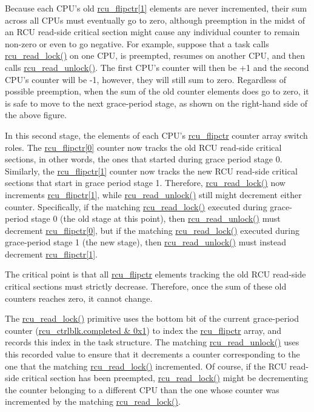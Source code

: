 Because each CPU's old \url{rcu_flipctr[1]} elements are never
incremented, their sum across all CPUs must eventually go to zero,
although preemption in the midst of an RCU read-side critical section might
cause any individual counter to remain non-zero or even to go negative.
For example, suppose that a task calls \url{rcu_read_lock()} on
one CPU, is preempted, resumes on another CPU, and then calls
\url{rcu_read_unlock()}.
The first CPU's counter will then be +1 and the second CPU's counter
will be -1, however, they will still sum to zero.
Regardless of possible preemption, when the sum of the old counter
elements does go to zero, it is safe to move to the next grace-period
stage, as shown on the right-hand side of the above figure.

In this second stage, the elements of each CPU's \url{rcu_flipctr}
counter array switch roles.
The \url{rcu_flipctr[0]} counter now tracks the old RCU read-side
critical sections, in other words, the ones that started during
grace period stage 0.
Similarly, the \url{rcu_flipctr[1]} counter now tracks the new
RCU read-side critical sections that start in grace period stage 1.
Therefore, \url{rcu_read_lock()} now increments
\url{rcu_flipctr[1]}, while \url{rcu_read_unlock()} still
might decrement either counter.
Specifically, if the matching \url{rcu_read_lock()} executed
during grace-period stage 0 (the old stage at this point), then
\url{rcu_read_unlock()} must decrement \url{rcu_flipctr[0]},
but if the matching \url{rcu_read_lock()} executed during
grace-period stage 1 (the new stage), then \url{rcu_read_unlock()}
must instead decrement \url{rcu_flipctr[1]}.

The critical point is that all \url{rcu_flipctr} elements
tracking the old RCU read-side critical sections must strictly decrease.
Therefore, once the sum of these old counters reaches zero,
it cannot change.

The \url{rcu_read_lock()} primitive uses the bottom
bit of the current grace-period counter
(\url{rcu_ctrlblk.completed & 0x1}) to index the
\url{rcu_flipctr} array,
and records this index in the task structure.
The matching \url{rcu_read_unlock()} uses this recorded
value to ensure that it decrements a counter corresponding to
the one that the matching \url{rcu_read_lock()} incremented.
Of course, if the RCU read-side critical section has been preempted,
\url{rcu_read_lock()} might be decrementing the counter
belonging to a different CPU than the one whose counter was incremented
by the matching \url{rcu_read_lock()}.

